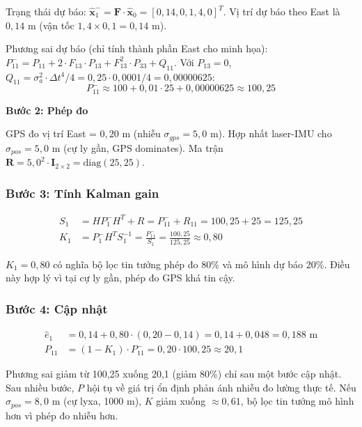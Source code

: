 Trạng thái dự báo: $\hat{\mathbf{x}}_1^- = \mathbf{F} \cdot \hat{\mathbf{x}}_0 = [0{,}14, 0, 1{,}4, 0]^T$. Vị trí dự báo theo East là $0{,}14$ m (vận tốc $1{,}4 \times 0{,}1 = 0{,}14$ m).

Phương sai dự báo (chỉ tính thành phần East cho minh họa): $P_{11}^- = P_{11} + 2 \cdot F_{13} \cdot P_{13} + F_{13}^2 \cdot P_{33} + Q_{11}$. Với $P_{13} = 0$, $Q_{11} = \sigma_a^2 \cdot \Delta t^4 / 4 = 0{,}25 \cdot 0{,}0001 / 4 = 0{,}00000625$:
\begin{equation}
    P_{11}^- \approx 100 + 0{,}01 \cdot 25 + 0{,}00000625 \approx 100{,}25
\end{equation}

\textbf{Bước 2: Phép đo}

GPS đo vị trí East = $0{,}20$ m (nhiễu $\sigma_{gps} = 5{,}0$ m). Hợp nhất laser-IMU cho $\sigma_{pos} = 5{,}0$ m (cự ly gần, GPS dominates). Ma trận $\mathbf{R} = 5{,}0^2 \cdot \mathbf{I}_{2\times2} = \text{diag}(25, 25)$.

\subsubsection{Bước 3: Tính Kalman gain\\}
\begin{align*}
    S_1 &= H P_1^- H^T + R = P_{11}^- + R_{11} = 100{,}25 + 25 = 125{,}25 \\
    K_1 &= P_1^- H^T S_1^{-1} = \frac{P_{11}^-}{S_1} = \frac{100{,}25}{125{,}25} \approx 0{,}80
\end{align*}

$K_1 = 0{,}80$ có nghĩa bộ lọc tin tưởng phép đo 80\% và mô hình dự báo 20\%. Điều này hợp lý vì tại cự ly gần, phép đo GPS khá tin cậy.

\subsubsection{Bước 4: Cập nhật\\}
\begin{align*}
    \hat{e}_1 &= 0{,}14 + 0{,}80 \cdot (0{,}20 - 0{,}14) = 0{,}14 + 0{,}048 = 0{,}188 \text{ m} \\
    P_{11} &= (1 - K_1) \cdot P_{11}^- = 0{,}20 \cdot 100{,}25 \approx 20{,}1
\end{align*}

Phương sai giảm từ 100,25 xuống 20,1 (giảm 80\%) chỉ sau một bước cập nhật. Sau nhiều bước, $P$ hội tụ về giá trị ổn định phản ánh nhiễu đo lường thực tế. Nếu $\sigma_{pos} = 8{,}0$ m (cự lyxa, 1000 m), $K$ giảm xuống $\approx 0{,}61$, bộ lọc tin tưởng mô hình hơn vì phép đo nhiễu hơn.

